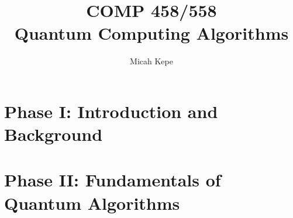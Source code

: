 \documentclass{report}
\title{\Huge{COMP 458/558}\\Quantum Computing Algorithms}
\author{\huge{Micah Kepe}}
\date{}
\begin{document}
\maketitle
\newpage%
{}
\tableofcontents
\pagebreak

\chapter{Phase I: Introduction and Background}















\chapter{Phase II: Fundamentals of Quantum Algorithms}



% 
% 

% 
% 
\end{document}
